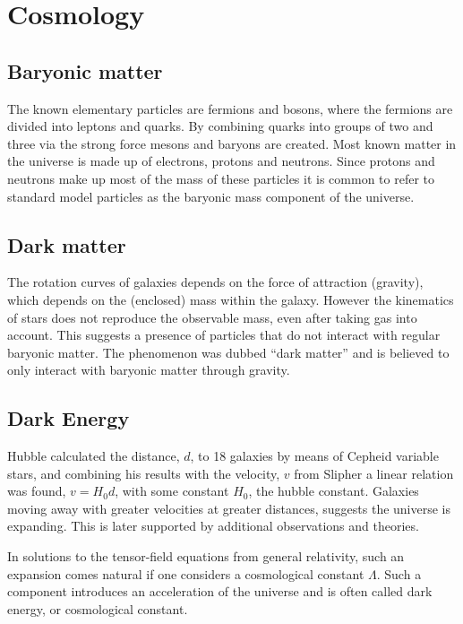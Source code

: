 \section{Cosmology} \label{sec:cosmology}

\subsection{Baryonic matter}
The known elementary particles are fermions and bosons, where the fermions are divided into leptons and quarks.
By combining quarks into groups of two and three via the strong force mesons and baryons are created.
Most known matter in the universe is made up of electrons, protons and neutrons. Since protons and neutrons make up most of the mass of these particles it is common to refer to standard model particles as the baryonic mass component of the universe.

\subsection{Dark matter}
The rotation curves of galaxies depends on the force of attraction (gravity), which depends on the (enclosed) mass within the galaxy.
However the kinematics of stars does not reproduce the observable mass, even after taking gas into account. This suggests a presence of particles that do not interact with regular baryonic matter. The phenomenon was dubbed ``dark matter'' and is believed to only interact with baryonic matter through gravity.

\subsection{Dark Energy}
Hubble calculated the distance, $d$, to 18 galaxies by means of Cepheid variable stars, and combining his results with the velocity, $v$ from Slipher a linear relation was found, $v=H_0d$, with some constant $H_0$, the hubble constant.
Galaxies moving away with greater velocities at greater distances, suggests the universe is expanding.
This is later supported by additional observations and theories.

In solutions to the tensor-field equations from general relativity, such an expansion comes natural if one considers a cosmological constant $\Lambda$. Such a component introduces an acceleration of the universe and is often called dark energy, or cosmological constant.

